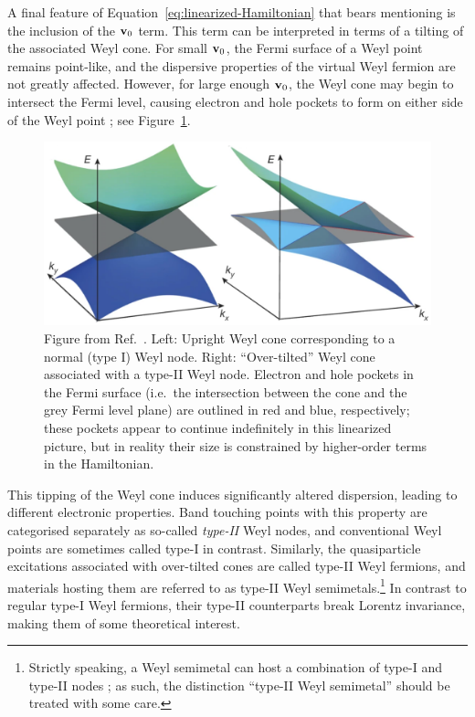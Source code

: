 A final feature of Equation~\eqref{eq:linearized-Hamiltonian} that bears mentioning is the inclusion of the $\vb{v}_0$ term. This term can be interpreted in terms of a tilting of the associated Weyl cone. For small $\vb{v}_0$, the Fermi surface of a Weyl point remains point-like, and the dispersive properties of the virtual Weyl fermion are not greatly affected. However, for large enough $\vb{v}_0$, the Weyl cone may begin to intersect the Fermi level, causing electron and hole pockets to form on either side of the Weyl point \cite{Soluyanov_Type-II}; see Figure~\ref{fig:Weyl-cone-tilt}.
\begin{figure}[htb!]
	\centering
	\includegraphics[width=.7\linewidth]{Images/Weyl-cone-tilt}
	\caption{Figure from Ref.~\cite{Soluyanov_Type-II}. Left: Upright Weyl cone corresponding to a normal (type I) Weyl node. Right: ``Over-tilted'' Weyl cone associated with a type-II Weyl node. Electron and hole pockets in the Fermi surface (i.e.\ the intersection between the cone and the grey Fermi level plane) are outlined in red and blue, respectively; these pockets appear to continue indefinitely in this linearized picture, but in reality their size is constrained by higher-order terms in the Hamiltonian.}
	\label{fig:Weyl-cone-tilt}
\end{figure}
This tipping of the Weyl cone induces significantly altered dispersion, leading to different electronic properties. Band touching points with this property are categorised separately as so-called \emph{type-II} Weyl nodes, and conventional Weyl points are sometimes called type-I in contrast. Similarly, the quasiparticle excitations associated with over-tilted cones are called type-II Weyl fermions, and materials hosting them are referred to as type-II Weyl semimetals.\footnote{
	Strictly speaking, a Weyl semimetal can host a combination of type-I and type-II nodes \cite{Zhang_type-I-II}; as such, the distinction ``type-II Weyl semimetal'' should be treated with some care.}
In contrast to regular type-I Weyl fermions, their type-II counterparts break Lorentz invariance, making them of some theoretical interest.


